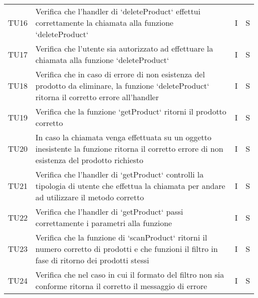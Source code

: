 \begin{center}
\begin{longtable}[!h]{p{45px} p{255px} p{35px} p{35px}}
        TU16          & Verifica che l'handler di `deleteProduct` effettui correttamente la chiamata alla funzione `deleteProduct`                                                                                       & I              & S              \\
        TU17          & Verifica che l'utente sia autorizzato ad effettuare la chiamata alla funzione `deleteProduct`                                                                                                                  & I              & S              \\
        TU18          & Verifica che in caso di errore di non esistenza del prodotto da eliminare, la funzione `deleteProduct` ritorna il corretto errore all'handler                                                                    & I              & S              \\
        TU19          & Verifica che la funzione `getProduct` ritorni il prodotto corretto                                                                                                                               & I              & S              \\
        TU20          & In caso la chiamata venga effettuata su un oggetto inesistente la funzione ritorna il corretto errore di non esistenza del prodotto richiesto                                                    & I              & S              \\
        TU21          & Verifica che l'handler di `getProduct` controlli la tipologia di utente che effettua la chiamata per andare ad utilizzare il metodo corretto                                                     & I              & S              \\
        TU22          & Verifica che l'handler di `getProduct` passi correttamente i parametri alla funzione                                                                                                             & I              & S              \\
        TU23          & Verifica che la funzione di `scanProduct` ritorni il numero corretto di prodotti e che funzioni il filtro in fase di ritorno dei prodotti stessi                                                 & I              & S              \\
        TU24          & Verifica che nel caso in cui il formato del filtro non sia conforme ritorna il corretto il messaggio di errore                                                                                                & I              & S              \\

\end{longtable}
\end{center}
